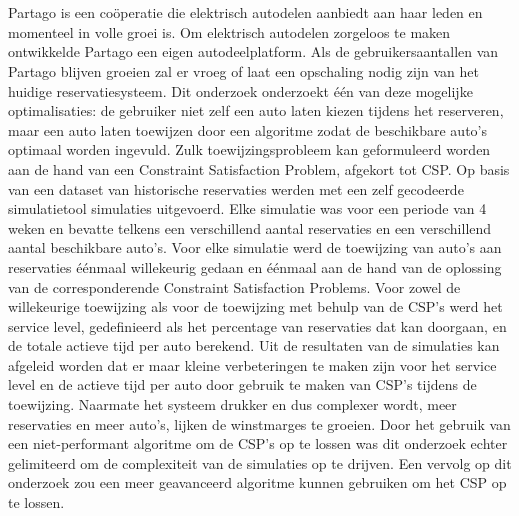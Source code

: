 \chapter*{}
Partago is een coöperatie die elektrisch autodelen aanbiedt aan haar leden en momenteel in volle groei is. Om elektrisch autodelen zorgeloos te maken ontwikkelde Partago een eigen autodeelplatform. Als de gebruikersaantallen van Partago blijven groeien zal er vroeg of laat een opschaling nodig zijn van het huidige reservatiesysteem. Dit onderzoek onderzoekt één van deze mogelijke optimalisaties: de gebruiker niet zelf een auto laten kiezen tijdens het reserveren, maar een auto laten toewijzen door een algoritme zodat de beschikbare auto's optimaal worden ingevuld. Zulk toewijzingsprobleem kan geformuleerd worden aan de hand van een Constraint Satisfaction Problem, afgekort tot CSP. Op basis van een dataset van historische reservaties werden met een zelf gecodeerde simulatietool simulaties uitgevoerd. Elke simulatie was voor een periode van 4 weken en bevatte telkens een verschillend aantal reservaties en een verschillend aantal beschikbare auto's. Voor elke simulatie werd de toewijzing van auto's aan reservaties éénmaal willekeurig gedaan en éénmaal aan de hand van de oplossing van de corresponderende Constraint Satisfaction Problems. Voor zowel de willekeurige toewijzing als voor de toewijzing met behulp van de CSP's werd het service level, gedefinieerd als het percentage van reservaties dat kan doorgaan, en de totale actieve tijd per auto berekend. Uit de resultaten van de simulaties kan afgeleid worden dat er maar kleine verbeteringen te maken zijn voor het service level en de actieve tijd per auto door gebruik te maken van CSP's tijdens de toewijzing. Naarmate het systeem drukker en dus complexer wordt, meer reservaties en meer auto's, lijken de winstmarges te groeien. Door het gebruik van een niet-performant algoritme om de CSP's op te lossen was dit onderzoek echter gelimiteerd om de complexiteit van de simulaties op te drijven. Een vervolg op dit onderzoek zou een meer geavanceerd algoritme kunnen gebruiken om het CSP op te lossen.
